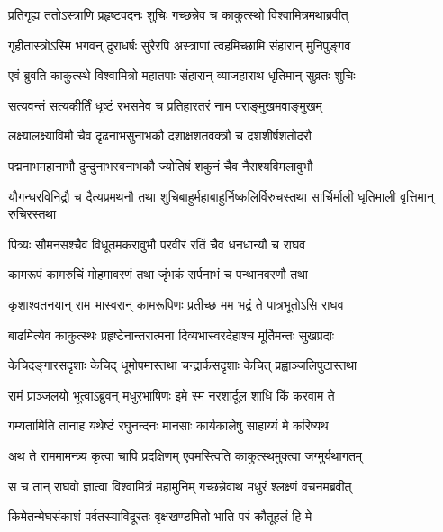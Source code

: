 
\twolineshloka
{प्रतिगृह्य ततोऽस्त्राणि प्रहृष्टवदनः शुचिः}
{गच्छन्नेव च काकुत्स्थो विश्वामित्रमथाब्रवीत्} %

\twolineshloka
{गृहीतास्त्रोऽस्मि भगवन् दुराधर्षः सुरैरपि}
{अस्त्राणां त्वहमिच्छामि संहारान् मुनिपुङ्गव} %

\twolineshloka
{एवं ब्रुवति काकुत्स्थे विश्वामित्रो महातपाः}
{संहारान् व्याजहाराथ धृतिमान् सुव्रतः शुचिः} %

\twolineshloka
{सत्यवन्तं सत्यकीर्तिं धृष्टं रभसमेव च}
{प्रतिहारतरं नाम पराङ्मुखमवाङ्मुखम्} %

\twolineshloka
{लक्ष्यालक्ष्याविमौ चैव दृढनाभसुनाभकौ}
{दशाक्षशतवक्त्रौ च दशशीर्षशतोदरौ} %

\twolineshloka
{पद्मनाभमहानाभौ दुन्दुनाभस्वनाभकौ}
{ज्योतिषं शकुनं चैव नैराश्यविमलावुभौ} %

\threelineshloka
{यौगन्धरविनिद्रौ च दैत्यप्रमथनौ तथा}
{शुचिबाहुर्महाबाहुर्निष्कलिर्विरुचस्तथा}
{सार्चिर्माली धृतिमाली वृत्तिमान् रुचिरस्तथा} %

\twolineshloka
{पित्र्यः सौमनसश्चैव विधूतमकरावुभौ}
{परवीरं रतिं चैव धनधान्यौ च राघव} %

\twolineshloka
{कामरूपं कामरुचिं मोहमावरणं तथा}
{जृंभकं सर्पनाभं च पन्थानवरणौ तथा} %

\twolineshloka
{कृशाश्वतनयान् राम भास्वरान् कामरूपिणः}
{प्रतीच्छ मम भद्रं ते पात्रभूतोऽसि राघव} %

\twolineshloka
{बाढमित्येव काकुत्स्थः प्रहृष्टेनान्तरात्मना}
{दिव्यभास्वरदेहाश्च मूर्तिमन्तः सुखप्रदाः} %

\twolineshloka
{केचिदङ्गारसदृशाः केचिद् धूमोपमास्तथा}
{चन्द्रार्कसदृशाः केचित् प्रह्वाञ्जलिपुटास्तथा} %

\twolineshloka
{रामं प्राञ्जलयो भूत्वाऽब्रुवन् मधुरभाषिणः}
{इमे स्म नरशार्दूल शाधि किं करवाम ते} %

\twolineshloka
{गम्यतामिति तानाह यथेष्टं रघुनन्दनः}
{मानसाः कार्यकालेषु साहाय्यं मे करिष्यथ} %

\twolineshloka
{अथ ते राममामन्त्र्य कृत्वा चापि प्रदक्षिणम्}
{एवमस्त्विति काकुत्स्थमुक्त्वा जग्मुर्यथागतम्} %

\twolineshloka
{स च तान् राघवो ज्ञात्वा विश्वामित्रं महामुनिम्}
{गच्छन्नेवाथ मधुरं श्लक्ष्णं वचनमब्रवीत्} %

\twolineshloka
{किमेतन्मेघसंकाशं पर्वतस्याविदूरतः}
{वृक्षखण्डमितो भाति परं कौतूहलं हि मे} %

